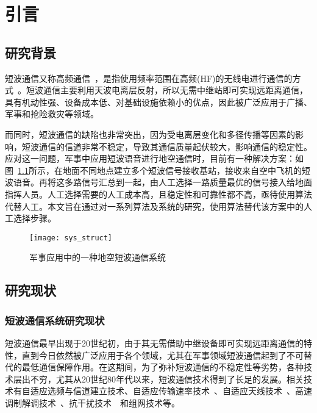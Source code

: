 
\chapter{引言}
\label{chapter:introduction}

\section{研究背景}

短波通信又称高频通信~\cite{胡中豫2003现代短波通信}，是指使用频率范围在高频(HF)的无线电进行通信的方式~\cite{董彬虹2007短波通信的现状及发展趋势}。短波通信主要利用天波电离层反射，所以无需中继站即可实现远距离通信，具有机动性强、设备成本低、对基础设施依赖小的优点，因此被广泛应用于广播、军事和抢险救灾等领域。

而同时，短波通信的缺陷也非常突出，因为受电离层变化和多径传播等因素的影响，短波通信的信道非常不稳定，导致其通信质量起伏较大，影响通信的稳定性。应对这一问题，军事中应用短波语音进行地空通信时，目前有一种解决方案：如图~\ref{fig:sys_struct}所示，在地面不同地点建立多个短波信号接收基站，接收来自空中飞机的短波语音。再将这多路信号汇总到一起，由人工选择一路质量最优的信号接入给地面指挥人员。人工选择需要的人工成本高，且稳定性和可靠性都不高，亟待使用算法代替人工。本文旨在通过对一系列算法及系统的研究，使用算法替代该方案中的人工选择步骤。

\begin{figure}
\centering
\texttt{[image: sys\_struct]}
\caption{军事应用中的一种地空短波通信系统\label{fig:sys_struct}}
\end{figure}

\section{研究现状}

\subsection{短波通信系统研究现状}

短波通信最早出现于20世纪初，由于其无需借助中继设备即可实现远距离通信的特性，直到今日依然被广泛应用于各个领域，尤其在军事领域短波通信起到了不可替代的最低通信保障作用。在这期间，为了弥补短波通信的不稳定性等劣势，各种技术层出不穷，尤其从20世纪80年代以来，短波通信技术得到了长足的发展。相关技术有自适应选频与信道建立技术、自适应传输速率技术~\cite{clarke2003multilevel}、自适应天线技术~\cite{cook2012adaptive}、高速调制解调技术~\cite{nilsson1997wideband}、抗干扰技术~\cite{andersson1995performance}~\cite{zander1995adaptive}和组网技术等。

